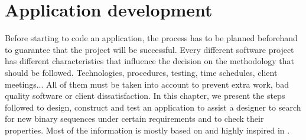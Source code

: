 \chapter{Application development}

Before starting to code an application, the process has to be planned beforehand to guarantee that the project will be successful. Every different software project has different
characteristics that influence the decision on the methodology that should be followed.
Technologies, procedures, testing, time schedules, client meetings... All of
them must be taken into account to prevent extra work, bad quality software or
client dissatisfaction. In this chapter, we present the steps followed to design, construct and test an application to assist a designer to search for new binary sequences under certain requirements and to check their properties. Most of the information is mostly based on  \citet{Sommerville} and highly inspired in \citet{Mario_diaz}.








